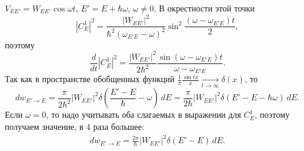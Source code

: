 \documentclass[a4paper
]{article}
\begin{document}
$V_{EE'}=W_{EE'}\cos \omega t$, $E'=E+\hbar\omega$, $\omega\ne 0$.
В окрестности этой точки $$|C^1_E|^2=\frac{|W_{EE'}|^2}{\hbar^2(\omega_{E'E}
-\omega)^2}\sin^2\frac{(\omega-\omega_{E'E})t}{2},$$ поэтому
$$\frac{d}{dt}|C^1_E|^2=\frac{|W_{EE'}|^2}{2\hbar^2}\frac{\sin (\omega-
\omega_{E'E})t}{\omega-\omega_{E'E}}.$$ Так как в пространстве обобщенных
функций $\frac{1}{\pi}\frac{\sin tx}{x}\underset{t\rightarrow \infty}{\rightarrow}
\delta(x)$, то $$dw_{E'\rightarrow E}=\frac{\pi}{2\hbar^2}|W_{EE'}|^2\delta
\left(\frac{E'-E}{\hbar}-\omega\right)\, dE=\frac{\pi}{2\hbar}|W_{EE'}|^2
\delta(E'-E-\hbar\omega)\, dE.$$ Если $\omega=0$, то надо учитывать оба
слагаемых в выражении для $C^1_E$, поэтому получаем значение, в 4 раза
большее:
\begin{align}
\label{dwee_}
dw_{E'\rightarrow E}=\frac{2\pi}{\hbar}|W_{EE'}|^2\delta(E'-E)\, dE.
\end{align}
\end{document}
